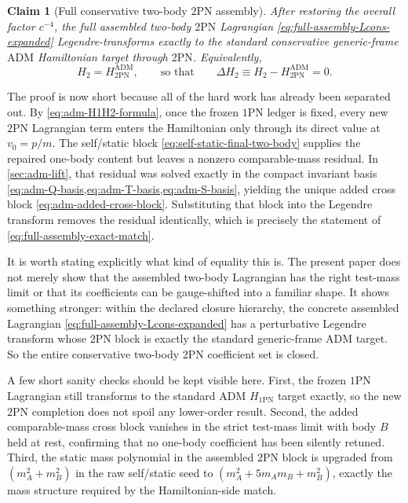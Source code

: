 \documentclass[11pt]{article}
\newcommand{\OnePN}{\mathrm{1PN}}
\newcommand{\TwoPN}{\mathrm{2PN}}
\newcommand{\ADM}{\mathrm{ADM}}
\newtheorem{claim}{Claim}
\begin{document}
\begin{claim}[Full conservative two-body \texorpdfstring{$2$}{2}PN assembly]
\label{clm:full-2pn}
After restoring the overall factor \(c^{-4}\), the full assembled two-body
\(\TwoPN\) Lagrangian
\cref{eq:full-assembly-Lcons-expanded} Legendre-transforms exactly to the standard
conservative generic-frame \(\ADM\) Hamiltonian target through \(\TwoPN\).  Equivalently,
\begin{equation}
H_2=H_{2\mathrm{PN}}^{\ADM},
\qquad\text{so that}\qquad
\Delta H_2\equiv H_2-H_{2\mathrm{PN}}^{\ADM}=0.
\label{eq:full-assembly-exact-match}
\end{equation}
\end{claim}

The proof is now short because all of the hard work has already been separated out.
By \cref{eq:adm-H1H2-formula}, once the frozen \(\OnePN\) ledger is fixed, every new
\(\TwoPN\) Lagrangian term enters the Hamiltonian only through its direct value at
\(v_0=p/m\).  The self/static block
\cref{eq:self-static-final-two-body} supplies the repaired one-body content but leaves a
nonzero comparable-mass residual.  In \cref{sec:adm-lift}, that residual was solved
exactly in the compact invariant basis
\cref{eq:adm-Q-basis,eq:adm-T-basis,eq:adm-S-basis}, yielding the unique added cross
block \cref{eq:adm-added-cross-block}.  Substituting that block into the Legendre
transform removes the residual identically, which is precisely the statement of
\cref{eq:full-assembly-exact-match}.

It is worth stating explicitly what kind of equality this is.  The present paper does
not merely show that the assembled two-body Lagrangian has the right test-mass limit or
that its coefficients can be gauge-shifted into a familiar shape.  It shows something
stronger: within the declared closure hierarchy, the concrete assembled Lagrangian
\cref{eq:full-assembly-Lcons-expanded} has a perturbative Legendre transform whose
\(\TwoPN\) block is exactly the standard generic-frame \(\ADM\) target.  So the entire
conservative two-body \(\TwoPN\) coefficient set is closed.

A few short sanity checks should be kept visible here.  First, the frozen
\(\OnePN\) Lagrangian still transforms to the standard \(\ADM\) \(H_{1\mathrm{PN}}\) target
exactly, so the new \(\TwoPN\) completion does not spoil any lower-order result.
Second, the added comparable-mass cross block vanishes in the strict test-mass limit with
body \(B\) held at rest, confirming that no one-body coefficient has been silently
retuned.  Third, the static mass polynomial in the assembled \(\TwoPN\) block is upgraded
from
\((m_A^2+m_B^2)\) in the raw self/static seed to
\((m_A^2+5m_A m_B+m_B^2)\), exactly the mass structure required by the Hamiltonian-side
match.
\end{document}

